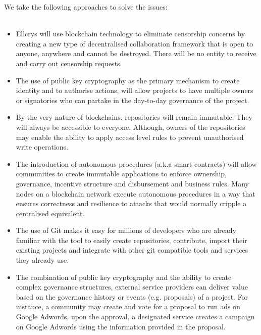 We take the following approaches to solve the issues:
\\\\
\begin{itemize}
\item Ellcrys will use blockchain technology to eliminate censorship concerns by creating a new type of decentralised collaboration framework that is open to anyone, anywhere and cannot be destroyed. There will be no entity to receive and carry out censorship requests.

\item The use of public key cryptography as the primary mechanism to create identity and to authorise actions, will allow projects to have multiple owners or signatories who can partake in the day-to-day governance of the project.

\item By the very nature of blockchains, repositories will remain immutable: They will always be accessible to everyone. Although, owners of the repositories may enable the ability to apply access level rules to prevent unauthorised write operations.

\item The introduction of autonomous procedures (a.k.a smart contracts) will allow communities to create immutable applications to enforce ownership, governance, incentive structure and disbursement and business rules. Many nodes on a blockchain network execute autonomous procedures in a way that ensures correctness and resilience to attacks that would normally cripple a centralised equivalent.

\item The use of Git makes it easy for millions of developers who are already familiar with the tool to easily create repositories, contribute, import their existing projects and integrate with other git compatible tools and services they already use.

\item The combination of public key cryptography and the ability to create complex governance structures, external service providers can deliver value based on the governance history or events (e.g. proposals) of a project. For instance, a community may create and vote for a proposal to run ads on Google Adwords, upon the approval, a designated service creates a campaign on Google Adwords using the information provided in the proposal.

\end{itemize}


